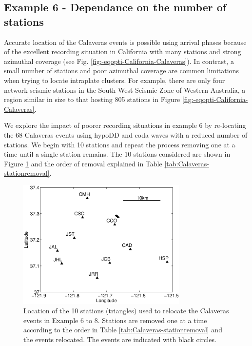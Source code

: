 \documentclass[extra, onecolumn, doublespacing]{gji}
\begin{document}
\subsection{Example 6 - Dependance on the number of stations}


Accurate location of the Calaveras events is possible using arrival
phases because of the excellent recording situation in California
with many stations and strong azimuthal coverage (see Fig.
\ref{fig:-eqopti-California-Calaveras}). In contrast, a small number
of stations and poor azimuthal coverage are common limitations when
trying to locate intraplate clusters. For example, there are only
four network seismic stations in the South West Seismic Zone of
Western Australia, a region similar in size to that hosting 805
stations in Figure \ref{fig:-eqopti-California-Calaveras}.

We explore the impact of poorer recording situations in example 6 by
re-locating the 68 Calaveras events  using hypoDD and coda waves
with a reduced number of stations. We begin with 10 stations and
repeat the process removing one at a time until a single station
remains. The 10 stations considered are shown in Figure
\ref{fig:-eqopti-Calaveras-substations} and the order of removal
explained in Table \ref{tab:Calaveras-stationremoval}.


\begin{figure}
\noindent\includegraphics[width =
20pc]{diags/CalaverasMap/matlab/Calaveras_substationmap}
\caption{Location of the 10 stations (triangles) used to relocate
the Calaveras events in Example 6 to 8. Stations are removed one at
a time according to the order in Table
\ref{tab:Calaveras-stationremoval} and the events relocated. The
events are indicated with black circles.}
\label{fig:-eqopti-Calaveras-substations}
\end{figure}
\end{document}

